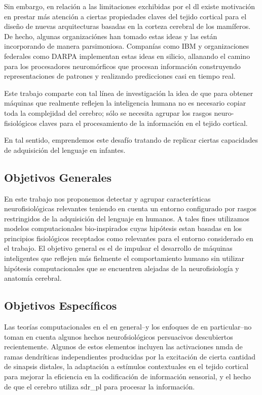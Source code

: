 Sin embargo, en relación a las limitaciones exchibidas por el \gls{dl} existe motivación en prestar más atención
a ciertas propiedades claves del tejido cortical para el diseño de nuevas arquitecturas
basadas en la corteza cerebral de los mamíferos.
De hecho, algunas organizaciónes han tomado estas ideas y las están incorporando de manera parsimoniosa.
Companías como IBM y organizaciones federales como DARPA implementan estas ideas en silicio,
allanando el camino para los procesadores neuromórficos que procesan información 
construyendo representaciones de patrones y realizando predicciones casi en tiempo real.




Este trabajo comparte con tal línea de investigación la idea de que para
obtener máquinas que realmente reflejen la inteligencia humana no es necesario
copiar toda la complejidad del cerebro; sólo se necesita agrupar
los rasgos neuro-fisiológicos claves para el procesamiento de la información en el tejido cortical.




En tal sentido, emprendemos este desafío tratando de replicar ciertas capacidades de adquisición del lenguaje en infantes.





\subsection{Objetivos Generales}

En este trabajo nos proponemos detectar y agrupar características neurofisiológicas relevantes teniendo en cuenta un entorno configurado por rasgos restringidos de la adquisición del lenguaje en humanos.
A tales fines utilizamos modelos computacionales bio-inspirados cuyas hipótesis estan basadas en los principios fisiológicos receptados como relevantes para el entorno considerado en el trabajo.
El objetivo general es el de impulsar el desarrollo de máquinas inteligentes que reflejen más fielmente el comportamiento humano sin utilizar hipótesis computacionales que se encuentren alejadas de la neurofisiología y anatomía cerebral.





\subsection{Objetivos Específicos}

Las teorías computacionales en el  en general--y los enfoques de  en particular--no toman en cuenta algunos hechos neurofsiológicos persuacivos descubiertos recientemente.
Algunos de estos elementos incluyen las activaciones \gls{nmda} de ramas dendríticas independientes producidas por la excitación de cierta cantidad de sinapsis distales, la adaptación a estímulos contextuales en el tejido cortical para mejorar la eficiencia en la codificación de información sensorial, y el hecho de que el cerebro utiliza \gls{sdr_pl} para procesar la información.

